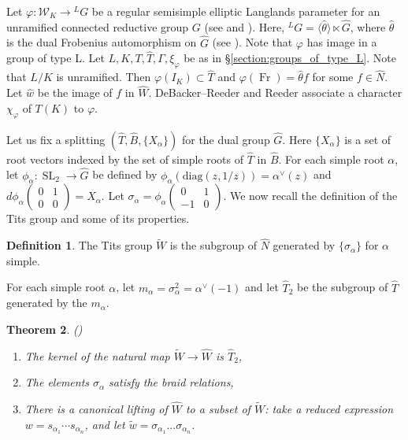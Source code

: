 \documentclass[11pt]{amsart}
\theoremstyle{plain}
\newtheorem{theorem}{Theorem}[section]
\theoremstyle{definition}
\newtheorem{definition}[theorem]{Definition}
\DeclareMathOperator{\Fr}{Fr}
\DeclareMathOperator{\SL}{SL}
\newcommand{\mat}[4]{\left( \begin{array}{cc} {#1} & {#2} \\ {#3} & {#4}
\end{array} \right)}
\newcommand{\Weil}{\mathcal{W}}
\begin{document}
Let $\varphi : \Weil_K \rightarrow {}^L G$ be a regular semisimple elliptic Langlands
parameter for an unramified connected reductive group $G$
(see \cite{reeder-debacker:09a} and \cite{reeder:08a}).
Here, ${}^L G = \langle \hat{\theta} \rangle \ltimes \hat{G}$,
where $\hat{\theta}$ is the dual Frobenius automorphism on $\hat{G}$
(see \cite[\S 3]{reeder-debacker:09a}).
Note that $\varphi$ has image in a group of
type L.  Let $L,K,T,\hat{T}, \Gamma, \xi_{\varphi}$ be as in
\S\ref{section:groups_of_type_L}.  Note that $L/K$ is unramified.
Then $\varphi(I_K) \subset \hat{T}$ and
$\varphi(\Fr) = \hat{\theta} f$ for some $f \in \hat{N}$.  Let $\hat{w}$
be the image of $f$ in $\hat{W}$.
DeBacker--Reeder \cite{reeder-debacker:09a} and Reeder \cite{reeder:08a}
associate a character $\chi_{\varphi}$ of $T(K)$ to $\varphi$.

Let us fix a splitting $(\hat{T}, \hat{B}, \{X_{\alpha} \})$
for the dual group $\hat{G}$.  Here $\{ X_{\alpha} \}$ is a set of root vectors
indexed by the set of simple roots of $\hat{T}$ in $\hat{B}$.
For each simple root $\alpha$, let $\phi_{\alpha} : \SL_2 \rightarrow \hat{G}$
be defined by $\phi_{\alpha}(\mathrm{diag}(z,1/z)) = \alpha^{\vee}(z)$
and $d \phi_{\alpha}\mat{0}{1}{0}{0} = X_{\alpha}$. Let
$\sigma_{\alpha} = \phi_{\alpha}\mat{0}{1}{-1}{0}$.  We now recall the definition of
the Tits group and some of its properties.

\begin{definition}
  The Tits group $\widetilde{W}$ is the subgroup of $\hat{N}$
  generated by $\{\sigma_{\alpha} \}$ for $\alpha$ simple.
\end{definition}

For each simple root $\alpha$, let $m_{\alpha} = \sigma_{\alpha}^2 = \alpha^{\vee}(-1)$ and
let $\hat{T}_2$ be the subgroup of $\hat{T}$ generated by the $m_{\alpha}$.

\begin{theorem}{(\cite{tits:66a})}
\begin{enumerate}

\item The kernel of the natural map $\widetilde{W} \rightarrow \hat{W}$
  is $\hat{T}_2$,
\item The elements $\sigma_{\alpha}$ satisfy the braid relations,
\item There is a canonical lifting of $\hat{W}$ to a subset of
  $\widetilde{W}$: take a reduced expression $w = s_{\alpha_1} \cdots s_{\alpha_n}$,
  and let $\tilde{w} = \sigma_{\alpha_1} ... \sigma_{\alpha_n}$.
\end{enumerate}
\end{theorem}
\end{document}
